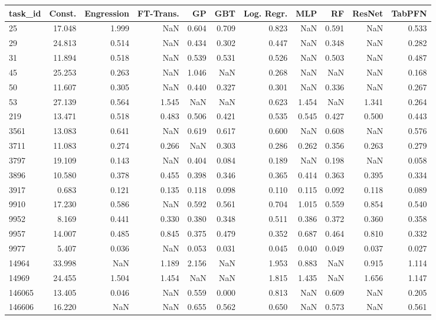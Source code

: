 \begin{tabular}{lrrrrrrrrrr}
\toprule
task\_id & Const. & Engression & FT-Trans. & GP & GBT & Log. Regr. & MLP & RF & ResNet & TabPFN \\
\midrule
25 & 17.048 & 1.999 & NaN & 0.604 & 0.709 & 0.823 & NaN & 0.591 & NaN & 0.533 \\
29 & 24.813 & 0.514 & NaN & 0.434 & 0.302 & 0.447 & NaN & 0.348 & NaN & 0.282 \\
31 & 11.894 & 0.518 & NaN & 0.539 & 0.531 & 0.526 & NaN & 0.503 & NaN & 0.487 \\
45 & 25.253 & 0.263 & NaN & 1.046 & NaN & 0.268 & NaN & NaN & NaN & 0.168 \\
50 & 11.607 & 0.305 & NaN & 0.440 & 0.327 & 0.301 & NaN & 0.336 & NaN & 0.267 \\
53 & 27.139 & 0.564 & 1.545 & NaN & NaN & 0.623 & 1.454 & NaN & 1.341 & 0.264 \\
219 & 13.471 & 0.518 & 0.483 & 0.506 & 0.421 & 0.535 & 0.545 & 0.427 & 0.500 & 0.443 \\
3561 & 13.083 & 0.641 & NaN & 0.619 & 0.617 & 0.600 & NaN & 0.608 & NaN & 0.576 \\
3711 & 11.083 & 0.274 & 0.266 & NaN & 0.303 & 0.286 & 0.262 & 0.356 & 0.263 & 0.279 \\
3797 & 19.109 & 0.143 & NaN & 0.404 & 0.084 & 0.189 & NaN & 0.198 & NaN & 0.058 \\
3896 & 10.580 & 0.378 & 0.455 & 0.398 & 0.346 & 0.365 & 0.414 & 0.363 & 0.395 & 0.334 \\
3917 & 0.683 & 0.121 & 0.135 & 0.118 & 0.098 & 0.110 & 0.115 & 0.092 & 0.118 & 0.089 \\
9910 & 17.230 & 0.586 & NaN & 0.592 & 0.561 & 0.704 & 1.015 & 0.559 & 0.854 & 0.540 \\
9952 & 8.169 & 0.441 & 0.330 & 0.380 & 0.348 & 0.511 & 0.386 & 0.372 & 0.360 & 0.358 \\
9957 & 14.007 & 0.485 & 0.845 & 0.375 & 0.479 & 0.352 & 0.687 & 0.464 & 0.810 & 0.332 \\
9977 & 5.407 & 0.036 & NaN & 0.053 & 0.031 & 0.045 & 0.040 & 0.049 & 0.037 & 0.027 \\
14964 & 33.998 & NaN & 1.189 & 2.156 & NaN & 1.953 & 0.883 & NaN & 0.915 & 1.114 \\
14969 & 24.455 & 1.504 & 1.454 & NaN & NaN & 1.815 & 1.435 & NaN & 1.656 & 1.147 \\
146065 & 13.405 & 0.046 & NaN & 0.559 & 0.000 & 0.813 & NaN & 0.609 & NaN & 0.205 \\
146606 & 16.220 & NaN & NaN & 0.655 & 0.562 & 0.650 & NaN & 0.573 & NaN & 0.561 \\

\end{tabular}
